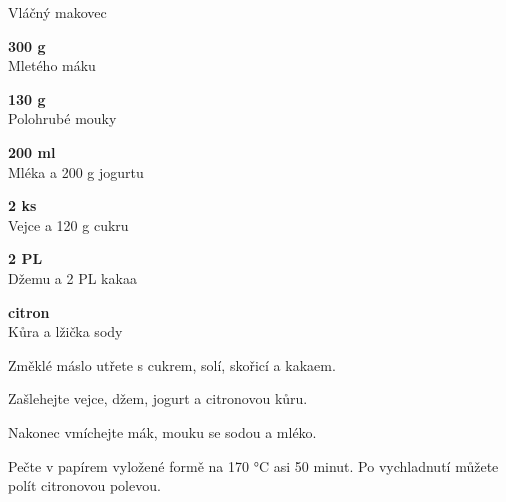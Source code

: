 \documentclass[11pt,a4paper]{article}
\begin{document}
\begin{recipe}[DimGray]{Vláčný makovec}
    \begin{ingredients}
        \item \parbox[t]{\linewidth}{\raggedright \weight \textbf{300 g}\\ Mletého máku}
        \item \parbox[t]{\linewidth}{\raggedright \weight \textbf{130 g}\\ Polohrubé mouky}
        \item \parbox[t]{\linewidth}{\raggedright \liquid \textbf{200 ml}\\ Mléka a 200 g jogurtu}
        \item \parbox[t]{\linewidth}{\raggedright \piece \textbf{2 ks}\\ Vejce a 120 g cukru}
        \item \parbox[t]{\linewidth}{\raggedright \spoon \textbf{2 PL}\\ Džemu a 2 PL kakaa}
        \item \parbox[t]{\linewidth}{\raggedright \indefinite \textbf{citron}\\ Kůra a lžička sody}
    \end{ingredients}
    \begin{steps}
        \item Změklé máslo utřete s cukrem, solí, skořicí a kakaem.
        \item Zašlehejte vejce, džem, jogurt a citronovou kůru.
        \item Nakonec vmíchejte mák, mouku se sodou a mléko.
        \item Pečte v papírem vyložené formě na 170 °C asi 50 minut. Po vychladnutí můžete polít citronovou polevou.
    \end{steps}
\end{recipe}
\end{document}
